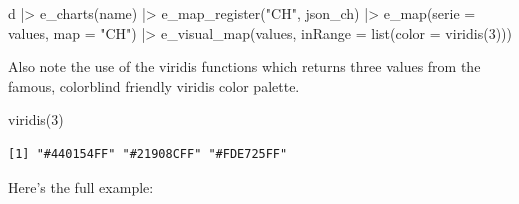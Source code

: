 \documentclass[
  12pt,
  letterpaper,
]{krantz}
\newenvironment{Shaded}{\begin{snugshade}}{\end{snugshade}}
\newcommand{\AttributeTok}[1]{\textcolor[rgb]{0.40,0.45,0.13}{#1}}
\newcommand{\DecValTok}[1]{\textcolor[rgb]{0.68,0.00,0.00}{#1}}
\newcommand{\FunctionTok}[1]{\textcolor[rgb]{0.28,0.35,0.67}{#1}}
\newcommand{\NormalTok}[1]{\textcolor[rgb]{0.00,0.23,0.31}{#1}}
\newcommand{\SpecialCharTok}[1]{\textcolor[rgb]{0.37,0.37,0.37}{#1}}
\newcommand{\StringTok}[1]{\textcolor[rgb]{0.13,0.47,0.30}{#1}}
\begin{document}
\begin{Shaded}
\begin{Highlighting}[]
\NormalTok{d }\SpecialCharTok{|\textgreater{}}
  \FunctionTok{e\_charts}\NormalTok{(name) }\SpecialCharTok{|\textgreater{}}
  \FunctionTok{e\_map\_register}\NormalTok{(}\StringTok{"CH"}\NormalTok{, json\_ch) }\SpecialCharTok{|\textgreater{}}
  \FunctionTok{e\_map}\NormalTok{(}\AttributeTok{serie =}\NormalTok{ values, }\AttributeTok{map =} \StringTok{"CH"}\NormalTok{) }\SpecialCharTok{|\textgreater{}}
  \FunctionTok{e\_visual\_map}\NormalTok{(values,}
               \AttributeTok{inRange =} \FunctionTok{list}\NormalTok{(}\AttributeTok{color =} \FunctionTok{viridis}\NormalTok{(}\DecValTok{3}\NormalTok{)))}
\end{Highlighting}
\end{Shaded}

Also note the use of the viridis functions which returns three values
from the famous, colorblind friendly viridis color palette.

\begin{Shaded}
\begin{Highlighting}[]
\FunctionTok{viridis}\NormalTok{(}\DecValTok{3}\NormalTok{)}
\end{Highlighting}
\end{Shaded}

\begin{verbatim}
[1] "#440154FF" "#21908CFF" "#FDE725FF"
\end{verbatim}

Here's the full example:
\end{document}
